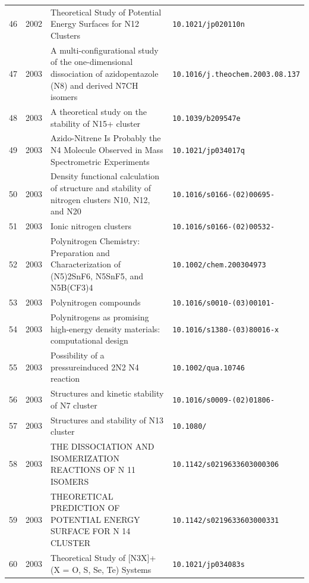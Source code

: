 {\begin{longtable}{@{}cp{1.0cm}p{8.4cm}p{4.2cm}@{}}
46 & 2002 & Theoretical Study of Potential Energy Surfaces for N12 Clusters & \texttt{10.1021/\allowbreak jp020110n} \\
47 & 2003 & A multi-configurational study of the one-dimensional dissociation of azidopentazole (N8) and derived N7CH isomers & \texttt{10.1016/\allowbreak j.theochem.2003.08.137} \\
48 & 2003 & A theoretical study on the stability of N15+ cluster & \texttt{10.1039/\allowbreak b209547e} \\
49 & 2003 & Azido-Nitrene Is Probably the N4 Molecule Observed in Mass Spectrometric Experiments & \texttt{10.1021/\allowbreak jp034017q} \\
50 & 2003 & Density functional calculation of structure and stability of nitrogen clusters N10, N12, and N20 & \texttt{10.1016/\allowbreak s0166-\allowbreak 1280(02)00695-\allowbreak 4} \\
51 & 2003 & Ionic nitrogen clusters & \texttt{10.1016/\allowbreak s0166-\allowbreak 1280(02)00532-\allowbreak 8} \\
52 & 2003 & Polynitrogen Chemistry: Preparation and Characterization of (N5)2SnF6, N5SnF5, and N5B(CF3)4 & \texttt{10.1002/\allowbreak chem.200304973} \\
53 & 2003 & Polynitrogen compounds & \texttt{10.1016/\allowbreak s0010-\allowbreak 8545(03)00101-\allowbreak 2} \\
54 & 2003 & Polynitrogens as promising high-energy density materials: computational design & \texttt{10.1016/\allowbreak s1380-\allowbreak 7323(03)80016-\allowbreak x} \\
55 & 2003 & Possibility of a pressureinduced 2N2 N4 reaction & \texttt{10.1002/\allowbreak qua.10746} \\
56 & 2003 & Structures and kinetic stability of N7 cluster & \texttt{10.1016/\allowbreak s0009-\allowbreak 2614(02)01806-\allowbreak 7} \\
57 & 2003 & Structures and stability of N13 cluster & \texttt{10.1080/\allowbreak 00268970310001593303} \\
58 & 2003 & THE DISSOCIATION AND ISOMERIZATION REACTIONS OF N 11 ISOMERS & \texttt{10.1142/\allowbreak s0219633603000306} \\
59 & 2003 & THEORETICAL PREDICTION OF POTENTIAL ENERGY SURFACE FOR N 14 CLUSTER & \texttt{10.1142/\allowbreak s0219633603000331} \\
60 & 2003 & Theoretical Study of [N3X]+ (X = O, S, Se, Te) Systems & \texttt{10.1021/\allowbreak jp034083s} \\

\end{longtable}}
